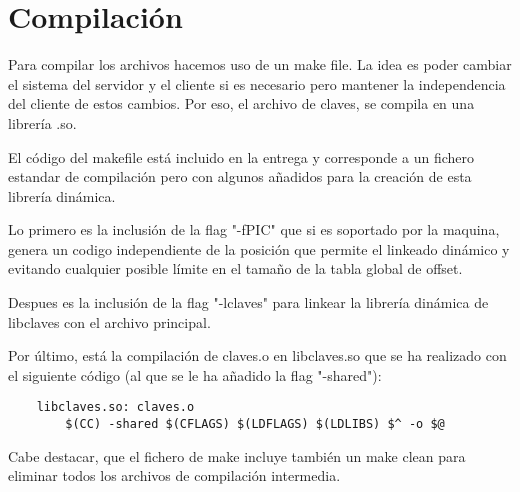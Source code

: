 \section{Compilación}
Para compilar los archivos hacemos uso de un make file. La idea es poder cambiar el sistema del servidor y el cliente si es necesario pero mantener la independencia del cliente de estos cambios. Por eso, el archivo de claves, se compila en una librería .so.

El código del makefile está incluido en la entrega y corresponde a un fichero estandar de compilación pero con algunos añadidos para la creación de esta librería dinámica.

Lo primero es la inclusión de la flag "-fPIC" que si es soportado por la maquina, genera un codigo independiente de la posición que permite el linkeado dinámico y evitando cualquier posible límite en el tamaño de la tabla global de offset.

Despues es la inclusión de la flag "-lclaves" para linkear la librería dinámica de libclaves con el archivo principal.

Por último, está la compilación de claves.o en libclaves.so que se ha realizado con el siguiente código (al que se le ha añadido la flag "-shared"):

\begin{lstlisting}
    libclaves.so: claves.o
        $(CC) -shared $(CFLAGS) $(LDFLAGS) $(LDLIBS) $^ -o $@
\end{lstlisting}

Cabe destacar, que el fichero de make incluye también un make clean para eliminar todos los archivos de compilación intermedia.